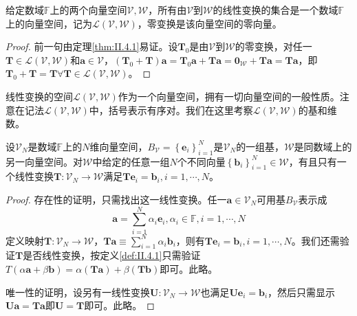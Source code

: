 \documentclass[main.tex]{subfiles}
\begin{document}
\begin{corollary}
给定数域$\mathbb{F}$上的两个向量空间$\mathcal{V},\mathcal{W}$，所有由$\mathcal{V}$到$\mathcal{W}$的线性变换的集合是一个数域$\mathbb{F}$上的向量空间，记为$\mathcal{L}\left(\mathcal{V},\mathcal{W}\right)$，零变换是该向量空间的零向量。
\end{corollary}
\begin{proof}
前一句由定理\ref{thm:II.4.1}易证。设$\mathbf{T}_0$是由$\mathcal{V}$到$\mathcal{W}$的零变换，对任一$\mathbf{T}\in\mathcal{L}\left(\mathcal{V},\mathcal{W}\right)$和$\mathbf{a}\in\mathcal{V}$，$\left(\mathbf{T}_0+\mathbf{T}\right)\mathbf{a}=\mathbf{T}_0\mathbf{a}+\mathbf{Ta}=\mathbf{0}_\mathcal{W}+\mathbf{Ta}=\mathbf{Ta}$，即$\mathbf{T}_0+\mathbf{T}=\mathbf{T}\forall\mathbf{T}\in\mathcal{L}\left(\mathcal{V},\mathcal{W}\right)$。
\end{proof}

线性变换的空间$\mathcal{L}\left(\mathcal{V},\mathcal{W}\right)$作为一个向量空间，拥有一切向量空间的一般性质。注意在记法$\mathcal{L}\left(\mathcal{V},\mathcal{W}\right)$中，括号表示有序对。我们在这里考察$\mathcal{L}\left(\mathcal{V},\mathcal{W}\right)$的基和维数。

\begin{lemma}\label{lem:II.4.1}
设$\mathcal{V}_N$是数域$\mathbb{F}$上的$N$维向量空间，$B_\mathcal{V}=\left\{\mathbf{e}_i\right\}_{i=1}^N$是$\mathcal{V}_N$的一组基，$\mathcal{W}$是同数域上的另一向量空间。对$\mathcal{W}$中给定的任意一组$N$个不同向量$\left\{\mathbf{b}_i\right\}_{i=1}^N\in\mathcal{W}$，有且只有一个线性变换$\mathbf{T}:\mathcal{V}_N\rightarrow\mathcal{W}$满足$\mathbf{Te}_i=\mathbf{b}_i,i=1,\cdots,N$。
\end{lemma}
\begin{proof}
存在性的证明，只需找出这一线性变换。任一$\mathbf{a}\in\mathcal{V}_N$可用基$B_\mathcal{V}$表示成
\[\mathbf{a}=\sum_{i=1}^N\alpha_i\mathbf{e}_i,\alpha_i\in\mathbb{F},i=1,\cdots,N\]
定义映射$\mathbf{T}:\mathcal{V}_N\rightarrow\mathcal{W}，\mathbf{Ta}\equiv\sum_{i=1}^N\alpha_i\mathbf{b}_i$，则有$\mathbf{Te}_i=\mathbf{b}_i,i=1,\cdots,N$。我们还需验证$\mathbf{T}$是否线性变换，按定义\ref{def:II.4.1}只需验证$T\left(\alpha\mathbf{a}+\beta\mathbf{b}\right)=\alpha\left(\mathbf{Ta}\right)+\beta\left(\mathbf{Tb}\right)$即可。此略。

唯一性的证明，设另有一线性变换$\mathbf{U}:\mathcal{V}_N\rightarrow\mathcal{W}$也满足$\mathbf{Ue}_i=\mathbf{b}_i$，然后只需显示$\mathbf{Ua}=\mathbf{Ta}$即$\mathbf{U}=\mathbf{T}$即可。此略。
\end{proof}
\end{document}

